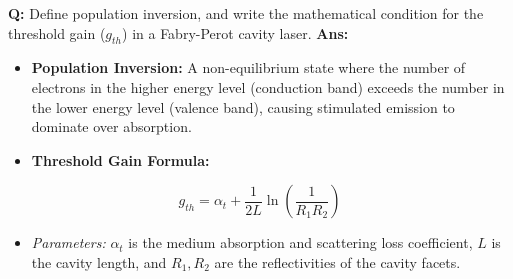 \documentclass[10pt,a4paper,twocolumn]{article}
\begin{document}
\begin{tcolorbox}[
  colback=white,
  colframe=UnitColorFour,
  colbacktitle=gray!10!white,
  coltitle=black,
  fonttitle=\bfseries\sffamily\small,
  title={Unit IV $\bullet$ Card 2: Population Inversion \& Lasing Threshold},
  boxrule=1.2pt,
  arc=2mm,
  outer arc=2mm,
  boxsep=1.5mm,
  top=1mm,
  bottom=1mm,
  left=1.5mm,
  right=1.5mm,
  before skip=2.5mm,
  after skip=2.5mm
]
\textbf{Q:} Define population inversion, and write the mathematical condition for the threshold gain ($g_{th}$) in a Fabry-Perot cavity laser.
\tcbline
\textbf{Ans:} \begin{itemize}
  \item   \textbf{Population Inversion:} A non-equilibrium state where the number of electrons in the higher energy level (conduction band) exceeds the number in the lower energy level (valence band), causing stimulated emission to dominate over absorption.
  \item   \textbf{Threshold Gain Formula:}
\end{itemize}
        \[ g_{th} = \alpha_t + \frac{1}{2L} \ln\left(\frac{1}{R_1 R_2}\right) \]
\begin{itemize}
  \item   \textit{Parameters:} $\alpha_t$ is the medium absorption and scattering loss coefficient, $L$ is the cavity length, and $R_1, R_2$ are the reflectivities of the cavity facets.
\end{itemize}
\end{tcolorbox}
\end{document}

